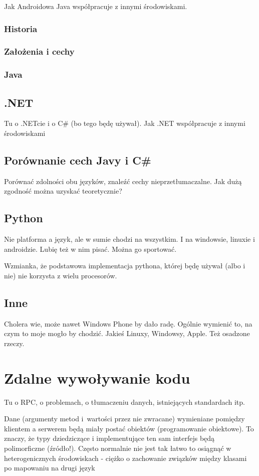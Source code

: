 Jak Androidowa Java współpracuje z innymi środowiskami.

\subsubsection{Historia}
\subsubsection{Założenia i cechy}
\subsubsection{Java}

\subsection{.NET}
Tu o .NETcie i o C\# (bo tego będę używał).
Jak .NET współpracuje z innymi środowiskami

\subsection{Porównanie cech Javy i C\#}
Porównać zdolności obu języków, znaleźć cechy nieprzetłumaczalne. Jak dużą zgodność można uzyskać teoretycznie?

\subsection{Python}
Nie platforma a język, ale w sumie chodzi na wszystkim. I na windowsie, linuxie i androidzie. Lubię też w nim pisać. Można go sportować.

Wzmianka, że podstawowa implementacja pythona, której będę używał (albo i nie) nie korzysta z wielu procesorów.

\subsection{Inne}
Cholera wie, może nawet Windows Phone by dało radę. Ogólnie wymienić to, na czym to moje mogło by chodzić. Jakieś Linuxy, Windowsy, Apple. Też osadzone rzeczy.

\section{Zdalne wywoływanie kodu}
Tu o RPC, o problemach, o tłumaczeniu danych, istniejących standardach itp.

Dane (argumenty metod i~wartości przez nie zwracane) wymieniane pomiędzy klientem a serwerem będą miały postać obiektów (programowanie obiektowe). To znaczy, że typy dziedziczące i implementujące ten sam interfejs będą polimorficzne (źródło!). Często normalnie nie jest tak łatwo to osiągnąć w heterogenicznych środowiskach - ciężko o zachowanie związków między klasami po mapowaniu na drugi język


